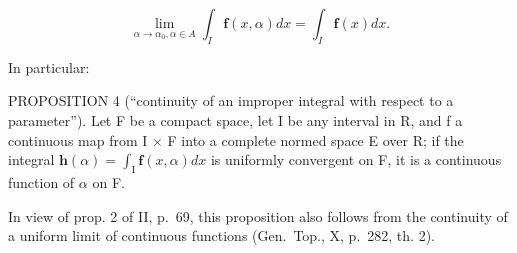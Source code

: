\[
\lim _ {\alpha \rightarrow \alpha_ {0}, \alpha \in A} \int_ {I} \mathbf {f} (x, \alpha) d x = \int_ {I} \mathbf {f} (x) d x.\tag{10}
\]

In particular:

PROPOSITION 4 (``continuity of an improper integral with respect to a parameter''). Let F be a compact space, let I be any interval in R, and f a continuous map from I × F into a complete normed space E over R; if the integral \(\mathbf{h}(\alpha) = \int_{\mathrm{I}} \mathbf{f}(x, \alpha) dx\) is uniformly convergent on F, it is a continuous function of \(\alpha\) on F.

In view of prop. 2 of II, p.~69, this proposition also follows from the continuity of a uniform limit of continuous functions (Gen.~Top., X, p.~282, th. 2).

